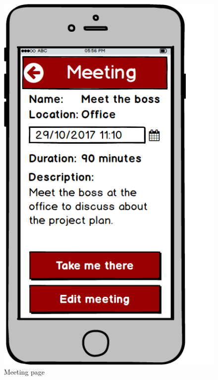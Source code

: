\begin{figure}[!htb]
\begin{minipage}[b]{0.3\textwidth}
	\includegraphics[scale=0.3]{images/Meeting}
	\caption{Meeting page}
	\label{ref:meeting}
\end{minipage}
\hfill
\begin{minipage}[b]{0.3\textwidth}
	\centering

\end{minipage}
\end{figure}
